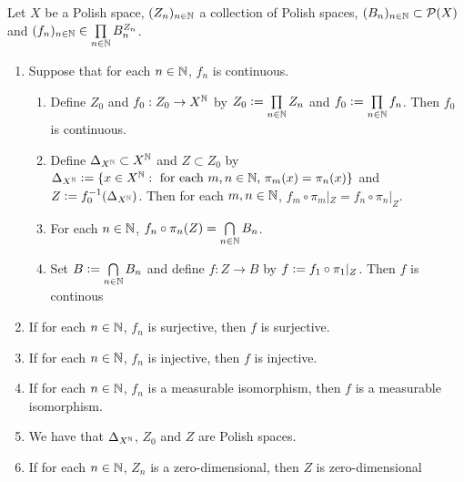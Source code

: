 \documentclass{book}
\begin{document}
	\begin{ex} 
		Let $X$ be a Polish space, $(Z_n)_{n \in \mathbb{N}}$ a collection of Polish spaces, $(B_n)_{n \in \mathbb{N}} \subset \mathcal{P}(X)$ and $(f_n)_{n \in \mathbb{N}} \in \prod\limits_{n \in \mathbb{N}} B_n^{Z_n}$. 
		\begin{enumerate}
			\item Suppose that for each $n \in \mathbb{N}$, $f_n$ is continuous.
			\begin{enumerate}
				\item Define $Z_0$ and $f_0: Z_0 \rightarrow X^{\mathbb{N}}$ by $Z_0 \vcentcolon= \prod\limits_{n \in \mathbb{N}} Z_n$ and $f_0 \vcentcolon= \prod\limits_{n \in \mathbb{N}} f_n$. Then $f_0$ is continuous.
				\item Define $\Delta_{X^{\mathbb{N}}} \subset X^{\mathbb{N}}$ and $Z \subset Z_0$ by $\Delta_{X^{\mathbb{N}}} \vcentcolon= \{x \in X^{\mathbb{N}}: \text{ for each $m,n \in \mathbb{N}$, $\pi_m(x) = \pi_n(x)$}\}$ and $Z \vcentcolon= f_0^{-1}(\Delta_{X^{\mathbb{N}}})$. Then for each $m,n \in \mathbb{N}$, $f_m \circ \pi_m|_Z = f_n \circ \pi_n|_Z$.
				\item For each $n \in \mathbb{N}$, $f_n \circ \pi_n(Z) = \bigcap\limits_{n \in \mathbb{N}} B_n$.
				\item Set $B \vcentcolon= \bigcap\limits_{n \in \mathbb{N}} B_n$ and define $f:Z \rightarrow B$ by $f \vcentcolon= f_1 \circ \pi_1|_Z$. Then $f$ is continous
			\end{enumerate}
			\item If for each $n \in \mathbb{N}$, $f_n$ is surjective, then $f$ is surjective.
			\item If for each $n \in \mathbb{N}$, $f_n$ is injective, then $f$ is injective.
			\item If for each $n \in \mathbb{N}$, $f_n$ is a measurable isomorphism, then $f$ is a measurable isomorphism.
			\item We have that $\Delta_{X^{\mathbb{N}}}$, $Z_0$ and $Z$ are Polish spaces. 
			\item If for each $n \in \mathbb{N}$, $Z_n$ is a zero-dimensional, then $Z$ is zero-dimensional
		\end{enumerate}
	\end{ex}
\end{document}
